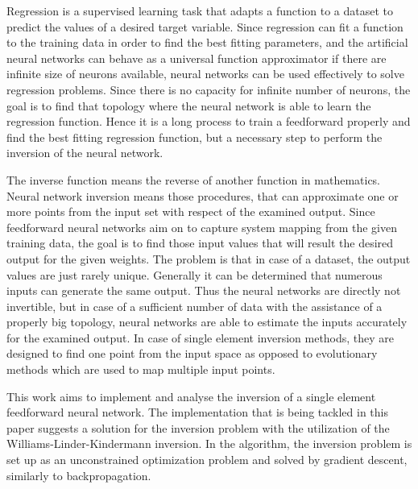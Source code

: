 Regression is a supervised learning task that adapts a function to a dataset to predict the values of a desired target variable. Since regression can fit a function to the training data in order to find the best fitting parameters, and the artificial neural networks can behave as a universal function approximator if there are infinite size of neurons available, neural networks can be used effectively to solve regression problems. Since there is no capacity for infinite number of neurons, the goal is to find that topology where the neural network is able to learn the regression function. Hence it is a long process to train a feedforward properly and find the best fitting regression function, but a necessary step to perform the inversion of the neural network. \medskip

The inverse function means the reverse of another function in mathematics. Neural network inversion means those procedures, that can approximate one or more points from the input set with respect of the examined output. Since feedforward neural networks aim on to capture system mapping from the given training data, the goal is to find those input values that will result the desired output for the given weights. The problem is that in case of a dataset, the output values are just rarely unique. Generally it can be determined that numerous inputs can generate the same output. Thus the neural networks are directly not invertible, but in case of a sufficient number of data with the assistance of a properly big topology, neural networks are able to estimate the inputs accurately for the examined output. In case of single element inversion methods, they are designed to find one point from the input space as opposed to evolutionary methods which are used to map multiple input points. \medskip

This work aims to implement and analyse the inversion of a single element feedforward neural network. The implementation that is being tackled in this paper suggests a solution for the inversion problem with the utilization of the Williams-Linder-Kindermann inversion. In the algorithm, the inversion problem is set up as an unconstrained optimization problem and solved by gradient descent, similarly to backpropagation.

